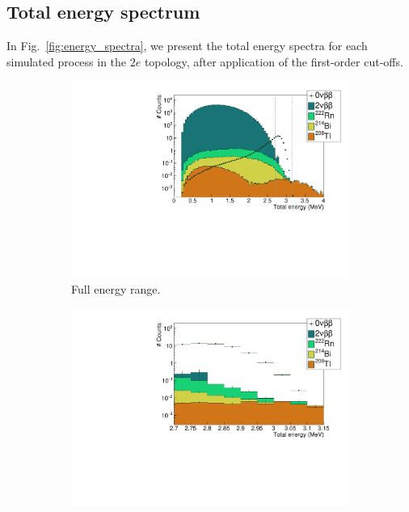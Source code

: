 \subsection{Total energy spectrum}

In Fig.~\ref{fig:energy_spectra}, we present the total energy spectra for each simulated process in the $2e$ topology, after application of the first-order cut-offs.
\begin{figure}[h!]
\centering
\begin{subfigure}[t]{0.7\textwidth}
  \centering
  \includegraphics[width=1.1\textwidth]{Sensitivity/fig_sensitivity/energy_spectrum_with_B_82Se.pdf}
  \captionsetup{justification=centering}
  \caption{Full energy range.
    \label{subfig:energy_spectra_full}}
\end{subfigure}
\hfill
\begin{subfigure}[t]{0.7\textwidth}
  \centering
  \includegraphics[width=1.1\textwidth]{Sensitivity/fig_sensitivity/energy_spectrum_with_B_82Se_zoom.pdf}

\end{subfigure}
\end{figure}
